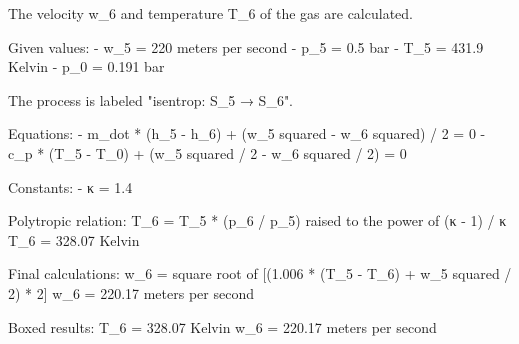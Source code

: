 The velocity w_6 and temperature T_6 of the gas are calculated.  

Given values:  
- w_5 = 220 meters per second  
- p_5 = 0.5 bar  
- T_5 = 431.9 Kelvin  
- p_0 = 0.191 bar  

The process is labeled "isentrop: S_5 → S_6".  

Equations:  
- m_dot * (h_5 - h_6) + (w_5 squared - w_6 squared) / 2 = 0  
- c_p * (T_5 - T_0) + (w_5 squared / 2 - w_6 squared / 2) = 0  

Constants:  
- κ = 1.4  

Polytropic relation:  
T_6 = T_5 * (p_6 / p_5) raised to the power of (κ - 1) / κ  
T_6 = 328.07 Kelvin  

Final calculations:  
w_6 = square root of [(1.006 * (T_5 - T_6) + w_5 squared / 2) * 2]  
w_6 = 220.17 meters per second  

Boxed results:  
T_6 = 328.07 Kelvin  
w_6 = 220.17 meters per second